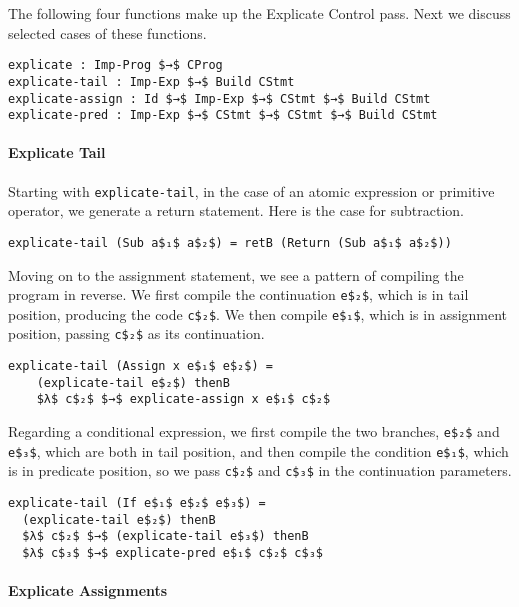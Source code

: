 \documentclass[sigplan,review,dvipsnames,screen,10pt]{acmart}
\begin{document}
\noindent The following four functions make up the Explicate Control
pass. Next we discuss selected cases of these functions.

\begin{lstlisting}[basicstyle=\ttfamily\footnotesize]
explicate : Imp-Prog $→$ CProg
explicate-tail : Imp-Exp $→$ Build CStmt
explicate-assign : Id $→$ Imp-Exp $→$ CStmt $→$ Build CStmt
explicate-pred : Imp-Exp $→$ CStmt $→$ CStmt $→$ Build CStmt
\end{lstlisting}

\paragraph{Explicate Tail}

Starting with \lstinline{explicate-tail}, in the case of an atomic
expression or primitive operator, we generate a return statement.
Here is the case for subtraction.

\begin{lstlisting}
explicate-tail (Sub a$₁$ a$₂$) = retB (Return (Sub a$₁$ a$₂$))
\end{lstlisting}

\noindent Moving on to the assignment statement, we see a pattern of
compiling the program in reverse. We first compile the continuation
\lstinline{e$₂$}, which is in tail position, producing the code \lstinline{c$₂$}.
We then compile \lstinline{e$₁$}, which is in assignment position,
passing \lstinline{c$₂$} as its continuation.

\begin{lstlisting}
explicate-tail (Assign x e$₁$ e$₂$) =
    (explicate-tail e$₂$) thenB
    $λ$ c$₂$ $→$ explicate-assign x e$₁$ c$₂$
\end{lstlisting}

\noindent Regarding a conditional expression, we first compile the two
branches, \lstinline{e$₂$} and \lstinline{e$₃$}, which are both in tail
position, and then compile the condition \lstinline{e$₁$}, which is in
predicate position, so we pass \lstinline{c$₂$} and \lstinline{c$₃$} in
the continuation parameters.

\begin{lstlisting}
explicate-tail (If e$₁$ e$₂$ e$₃$) =
  (explicate-tail e$₂$) thenB
  $λ$ c$₂$ $→$ (explicate-tail e$₃$) thenB
  $λ$ c$₃$ $→$ explicate-pred e$₁$ c$₂$ c$₃$
\end{lstlisting}

\paragraph{Explicate Assignments}
\end{document}
